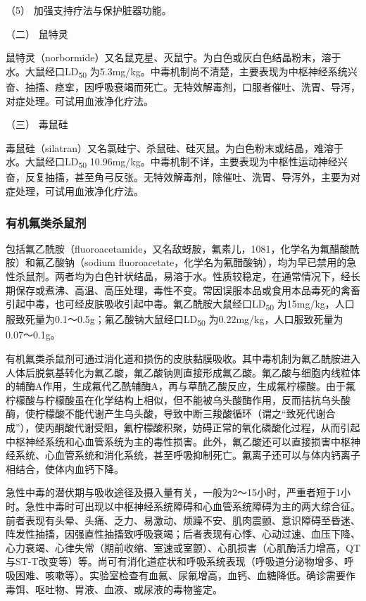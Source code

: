 （5） 加强支持疗法与保护脏器功能。

\hypertarget{text00144.htmlux5cux23CHP5-3-6-1-2}{}
（二） 鼠特灵

鼠特灵（norbormide）又名鼠克星、灭鼠宁。为白色或灰白色结晶粉末，溶于水。大鼠经口LD\textsubscript{50}
为5.3mg/kg。中毒机制尚不清楚，主要表现为中枢神经系统兴奋、抽搐、痉挛，因呼吸衰竭而死亡。无特效解毒剂，口服者催吐、洗胃、导泻，对症处理。可试用血液净化疗法。

\hypertarget{text00144.htmlux5cux23CHP5-3-6-1-3}{}
（三） 毒鼠硅

毒鼠硅（silatran）又名氯硅宁、杀鼠硅、硅灭鼠。为白色粉末或结晶，难溶于水。大鼠经口LD\textsubscript{50}
10.96mg/kg。中毒机制不详，主要表现为中枢性运动神经兴奋，反复抽搐，甚至角弓反张。无特效解毒剂，除催吐、洗胃、导泻外，主要为对症处理，可试用血液净化疗法。

\subsubsection{有机氟类杀鼠剂}

包括氟乙酰胺（fluoroacetamide，又名敌蚜胺，氟素儿，1081，化学名为氟醋酸酰胺）和氟乙酸钠（sodium
fluoroacetate，化学名为氟醋酸钠），均为早已禁用的急性杀鼠剂。两者均为白色针状结晶，易溶于水。性质较稳定，在通常情况下，经长期保存或煮沸、高温、高压处理，毒性不变。常因误服本品或食用本品毒死的禽畜引起中毒，也可经皮肤吸收引起中毒。氟乙酰胺大鼠经口LD\textsubscript{50}
为15mg/kg，人口服致死量为0.1～0.5g；氟乙酸钠大鼠经口LD\textsubscript{50}
为0.22mg/kg，人口服致死量为0.07～0.1g。

有机氟类杀鼠剂可通过消化道和损伤的皮肤黏膜吸收。其中毒机制为氟乙酰胺进入人体后脱氨基转化为氟乙酸，氟乙酸钠则直接形成氟乙酸。氟乙酸与细胞内线粒体的辅酶A作用，生成氟代乙酰辅酶A，再与草酰乙酸反应，生成氟柠檬酸。由于氟柠檬酸与柠檬酸虽在化学结构上相似，但不能被乌头酸酶作用，反而拮抗乌头酸酶，使柠檬酸不能代谢产生乌头酸，导致中断三羧酸循环（谓之“致死代谢合成”），使丙酮酸代谢受阻，氟柠檬酸积聚，妨碍正常的氧化磷酸化过程，从而引起中枢神经系统和心血管系统为主的毒性损害。此外，氟乙酸还可以直接损害中枢神经系统、心血管系统和消化系统，甚至呼吸抑制死亡。氟离子还可以与体内钙离子相结合，使体内血钙下降。

急性中毒的潜伏期与吸收途径及摄入量有关，一般为2～15小时，严重者短于1小时。急性中毒时可出现以中枢神经系统障碍和心血管系统障碍为主的两大综合征。前者表现有头晕、头痛、乏力、易激动、烦躁不安、肌肉震颤、意识障碍至昏迷、阵发性抽搐，因强直性抽搐致呼吸衰竭；后者表现有心悸、心动过速、血压下降、心力衰竭、心律失常（期前收缩、室速或室颤）、心肌损害（心肌酶活力增高，QT与ST-T改变等）等。尚可有消化道症状和呼吸系统表现（呼吸道分泌物增多、呼吸困难、咳嗽等）。实验室检查有血氟、尿氟增高，血钙、血糖降低。确诊需要作毒饵、呕吐物、胃液、血液、或尿液的毒物鉴定。

